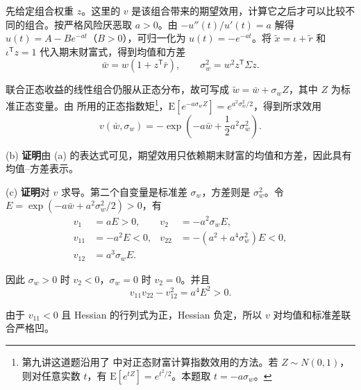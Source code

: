 \begin{solution}[label-content={(a) 解答}]
先给定组合权重 $z$。这里的 $v$ 是该组合带来的期望效用，计算它之后才可以比较不同的组合。按严格风险厌恶取 $a>0$。由 $-u''(t)/u'(t)=a$ 解得 $u(t)=A-Be^{-at}$（$B>0$），可归一化为 $u(t)=-e^{-at}$。将 $\tilde x=\iota+\tilde r$ 和 $\iota^{\mathsf T}z=1$ 代入期末财富式，得到均值和方差
\[
 \bar w=w(1+z^{\mathsf T}\bar r),\qquad
 \sigma_w^2=w^2z^{\mathsf T}\Sigma z.
\]

联合正态收益的线性组合仍服从正态分布，故可写成 $\tilde w=\bar w+\sigma_w Z$，其中 $Z$ 为标准正态变量。由 所用的正态指数矩\footnote{第九讲这道题沿用了 中对正态财富计算指数效用的方法。若 $Z\sim N(0,1)$，则对任意实数 $t$，有 $\mathrm E[e^{tZ}]=e^{t^2/2}$。本题取 $t=-a\sigma_w$。}，$\mathrm E[e^{-a\sigma_w Z}]=e^{a^2\sigma_w^2/2}$，得到所求效用
\[
 v(\bar w,\sigma_w)=-\exp\left(-a\bar w+\frac12a^2\sigma_w^2\right).
\]

(b) \textbf{证明}\quad 由 (a) 的表达式可见，期望效用只依赖期末财富的均值和方差，因此具有均值--方差表示。

(c) \textbf{证明}\quad 对 $v$ 求导。第二个自变量是标准差 $\sigma_w$，方差则是 $\sigma_w^2$。令 $E=\exp(-a\bar w+a^2\sigma_w^2/2)>0$，有
\[
 \begin{aligned}
 v_1&=aE>0,&v_2&=-a^2\sigma_wE,\\
 v_{11}&=-a^2E<0,&v_{22}&=-(a^2+a^4\sigma_w^2)E<0,\\
 v_{12}&=a^3\sigma_wE.
 \end{aligned}
\]

因此 $\sigma_w>0$ 时 $v_2<0$，$\sigma_w=0$ 时 $v_2=0$。并且
\[
 v_{11}v_{22}-v_{12}^2=a^4E^2>0.
\]

由于 $v_{11}<0$ 且 Hessian 的行列式为正，Hessian 负定，所以 $v$ 对均值和标准差联合严格凹。
\end{solution}

